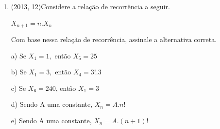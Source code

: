 \documentclass{article}
\begin{document}
\begin{enumerate}
Assinale a alternativa que apresenta, corretamente, a tradução em linguagem simbólica da negação da
sentença composta a seguir.

Se Pedro faz as tarefas todos os dias, então Pedro terá boas notas no final do ano.

a) $P \rightarrow Q$

b) $P \leftrightarrow Q$

c) $P \land \sim Q$

d) $\sim P\land \sim Q$

e) $\sim P \land Q$\newline


\textbf{RESOLUÇÃO}

$\rule[1cm]{100cm}{1px}$

1. $\sim(p \rightarrow q)$

2. $\sim( \sim p \lor q)$ CON(1)

3. $(\sim \sim p \land  \sim q)$ DM(2)

4. $( p \land  \sim q)$ DN(3) \newline

c) $P \land \sim Q$\newline


\textbf{CONTEÚDO}

$\rule[1cm]{100cm}{1px}$

condicional(COND) $\phi \rightarrow \psi \equiv \sim \phi \vee \psi$

DeMorgan(DM) $\sim(\phi \wedge \psi) \equiv \sim \phi \vee \sim \psi$ 

dupla negação(DN)$\neg \neg \phi \equiv \phi$

\newpage



\item(2013, 12)Considere a relação de recorrência a seguir.\newline

\hspace{50} $X_{n+1} = n . X_n$\newline

Com base nessa relação de recorrência, assinale a alternativa correta.

a) Se $X_1 = 1,$ então $X_5 = 25$

b) Se $X_1 = 3,$ então $X_4 = 3! . 3$

c) Se $X_6 = 240$, então $X_1 = 3$

d) Sendo A uma constante, $X_n = A . n!$

e) Sendo A uma constante, $X_n = A . (n + 1)!$\newline






\end{enumerate}
\end{document}
